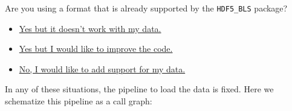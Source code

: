 \begin{tcolorbox}
    Are you using a format that is already supported by the \texttt{HDF5\_BLS} package?
    \begin{itemize}
        \item \hyperref[subsec:load_data.user_specific]{Yes but it doesn't work with my data.}
        \item \hyperref[subsec:load_data.improvement]{Yes but I would like to improve the code.}
        \item \hyperref[subsec:load_data.new_format]{No, I would like to add support for my data.}
    \end{itemize}
\end{tcolorbox}

In any of these situations, the pipeline to load the data is fixed. Here we schematize this pipeline as a call graph:

